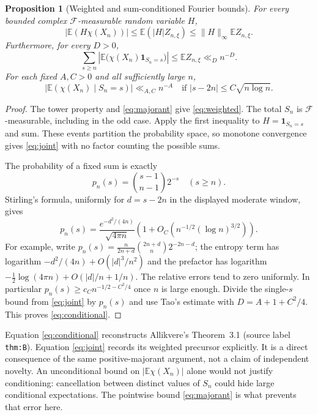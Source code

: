 \documentclass[11pt]{article}
\newtheorem{proposition}{Proposition}
\theoremstyle{remark}\newtheorem{remark}[proposition]{Remark}
\newcommand{\EE}{\mathbb E}
\newcommand{\one}{\mathbf 1}
\begin{document}
\begin{proposition}[Weighted and sum-conditioned Fourier bounds]
\label{prop:condition}
For every bounded complex $\mathcal F$-measurable random variable $H$,
\begin{equation}\label{eq:weighted}
 |\EE(H\chi(X_n))|\leq\EE(|H|Z_{n,\xi})
 \leq\|H\|_\infty\EE Z_{n,\xi}.
\end{equation}
Furthermore, for every $D>0$,
\begin{equation}\label{eq:joint}
 \sum_{s\geq n}\left|\EE\big(\chi(X_n)\one_{S_n=s}\big)\right|
 \leq\EE Z_{n,\xi}\ll_D n^{-D}.
\end{equation}
For each fixed $A,C>0$ and all sufficiently large $n$,
\begin{equation}\label{eq:conditional}
 \left|\EE(\chi(X_n)\mid S_n=s)\right|\ll_{A,C}n^{-A}
 \quad\text{if } |s-2n|\leq C\sqrt{n\log n}.
\end{equation}
\end{proposition}
\begin{proof}
The tower property and \eqref{eq:majorant} give \eqref{eq:weighted}.
The total $S_n$ is $\mathcal F$-measurable, including in the odd case.
Apply the first inequality to $H=\one_{S_n=s}$ and sum. These events
partition the probability space, so monotone convergence gives
\eqref{eq:joint} with no factor counting the possible sums.

The probability of a fixed sum is exactly
\[
 p_n(s)=\binom{s-1}{n-1}2^{-s}\quad(s\geq n).
\]
Stirling's formula, uniformly for $d=s-2n$ in the displayed moderate
window, gives
\[
 p_n(s)=\frac{e^{-d^2/(4n)}}{\sqrt{4\pi n}}
 \left(1+O_C\left(n^{-1/2}(\log n)^{3/2}\right)\right).
\]
For example, write $p_n(s)=\frac{n}{2n+d}\binom{2n+d}{n}2^{-2n-d}$;
the entropy term has logarithm $-d^2/(4n)+O(|d|^3/n^2)$ and the
prefactor has logarithm $-\tfrac12\log(4\pi n)+O(|d|/n+1/n)$.
The relative errors tend to zero uniformly. In particular
$p_n(s)\geq c_C n^{-1/2-C^2/4}$ once $n$ is large enough.
Divide the single-$s$ bound from \eqref{eq:joint} by $p_n(s)$ and use
Tao's estimate with $D=A+1+C^2/4$. This proves
\eqref{eq:conditional}.
\end{proof}

Equation \eqref{eq:conditional} reconstructs Allikvere's Theorem~3.1
(source label \texttt{thm:B}). Equation \eqref{eq:joint} records its
weighted precursor explicitly. It is a direct consequence of the same
positive-majorant argument, not a claim of independent novelty.
An unconditional bound on $|\EE\chi(X_n)|$ alone would not justify
conditioning: cancellation between distinct values of $S_n$ could hide
large conditional expectations. The pointwise bound
\eqref{eq:majorant} is what prevents that error here.
\end{document}
